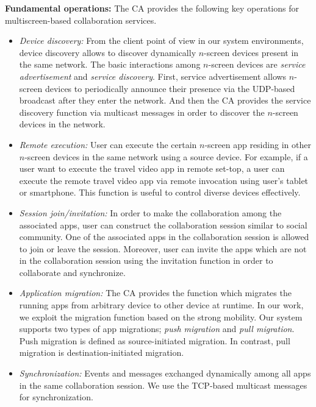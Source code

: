 \documentclass{sig-alternate}
\newcommand{\bi}{\begin{itemize}}
\newcommand{\ei}{\end{itemize}}
\newcommand{\ii}{\item}
\begin{document}
\noindent
\textbf{Fundamental operations:} 
The CA provides the following key operations for multiscreen-based collaboration services. 
\bi
\ii  \textit{Device discovery:} From the client point of view in our system environments, device discovery allows to discover dynamically $n$-screen devices present in  the same network.
The basic interactions among $n$-screen devices are \textit{service advertisement} and \textit{service discovery}.
First, service advertisement allows $n$-screen devices to periodically announce their presence  via the UDP-based broadcast after they enter the network.  
And then the CA provides the service discovery function via multicast messages in order to discover the $n$-screen devices in the network.
\ii \textit{Remote execution:} User can execute the certain $n$-screen app residing in other $n$-screen devices in the same network using a source device.
For example, if  a user want to execute the travel video app in remote set-top, a user can execute the remote travel video app via remote invocation using user's tablet or smartphone. This function is useful to control diverse devices effectively.
\ii  \textit{Session join/invitation:} In order to make the collaboration among the associated apps, user can construct the collaboration session similar to social community. One of the associated apps in the collaboration session is allowed to join or leave the session. Moreover, user can invite the apps which are not in the collaboration session using the invitation function in order to collaborate and synchronize.
\ii \textit{Application migration:}  The CA provides the function which migrates the running apps from arbitrary device to other device at runtime. In our work, we exploit the migration function based on the strong mobility. Our system supports two types of app migrations; \textit{push migration}  and \textit{pull migration}. Push migration is defined as source-initiated migration. In contrast, pull migration is destination-initiated migration. 
\ii \textit{Synchronization:} Events and messages exchanged dynamically among all apps in the same collaboration session. We use the TCP-based multicast messages for synchronization.
\ei
\end{document}
